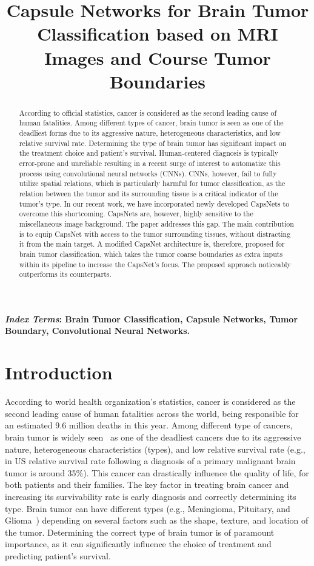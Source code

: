 \documentclass{article}
\title{Capsule Networks for Brain Tumor Classification based on MRI Images and Course Tumor Boundaries}
\begin{document}
\ninept
\maketitle
\begin{abstract}
According to official statistics, cancer is considered as the second leading cause of human fatalities. Among different types of cancer, brain tumor is seen as one of the deadliest forms due to its aggressive nature, heterogeneous characteristics, and low relative survival rate. Determining the type of brain tumor has significant impact on the treatment choice and patient's survival. Human-centered diagnosis is typically error-prone and unreliable resulting in a recent surge of interest to automatize this process using convolutional neural networks (CNNs). CNNs, however, fail to fully utilize spatial relations, which is particularly harmful for tumor classification, as the relation between the tumor and its surrounding tissue is a critical indicator of the tumor's type. In our recent work, we have incorporated newly developed CapsNets to overcome this shortcoming. CapsNets are, however, highly sensitive to the miscellaneous image background. The paper addresses this gap. The main contribution is to equip CapsNet with access to the tumor surrounding tissues, without distracting it from the main target. A modified CapsNet architecture is, therefore, proposed for brain tumor classification, which takes the tumor coarse boundaries as extra inputs within its pipeline to increase the CapsNet's focus. The proposed approach noticeably outperforms its counterparts.



\end{abstract}
\textbf{\textit{Index Terms}: Brain Tumor Classification, Capsule Networks, Tumor Boundary, Convolutional Neural Networks.}
\section{Introduction} \label{sec:Introduction}
According to world health organization's statistics, cancer is considered as the second leading cause of human fatalities across the world, being responsible for an estimated $9.6$ million deaths in this year. Among different type of cancers, brain tumor is widely seen~\cite{Siegel:2016} as one of the deadliest cancers due to its aggressive nature, heterogeneous characteristics (types), and low relative survival  rate (e.g., in US relative survival rate following a diagnosis of a primary malignant brain tumor is around 35\%). This cancer can drastically influence the quality of life, for both patients and their families. The key factor in treating brain cancer and increasing its survivability rate is early diagnosis and correctly determining its type. Brain tumor can have different types (e.g., Meningioma, Pituitary, and Glioma~\cite{Cheng:2015}) depending on several factors such as the shape, texture, and location of the tumor. Determining the correct type of brain tumor is of paramount importance, as it can significantly influence the choice of treatment and predicting patient's survival.
\end{document}
